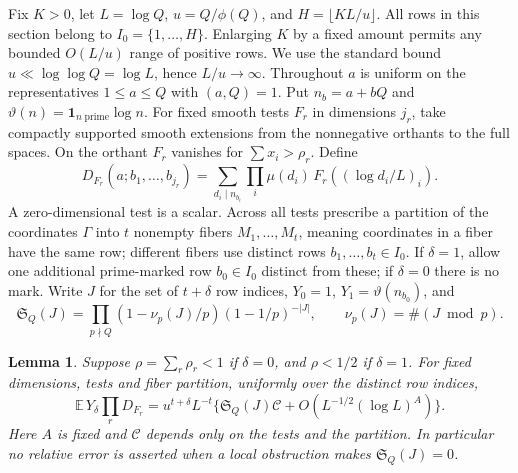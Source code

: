 \documentclass[11pt]{article}
\newtheorem{lemma}[theorem]{Lemma}
\theoremstyle{remark}
\numberwithin{equation}{section}
\newcommand{\E}{\mathbb E}
\newcommand{\Sg}{\mathfrak S}
\newcommand{\ind}{\mathbf 1}
\begin{document}
Fix $K>0$, let $L=\log Q$, $u=Q/\phi(Q)$, and
$H=\lfloor KL/u\rfloor$. All rows in this section belong to
$I_0=\{1,\ldots,H\}$. Enlarging $K$ by a fixed amount permits
any bounded $O(L/u)$ range of positive rows. We use the standard
bound $u\ll\log\log Q=\log L$, hence $L/u\to\infty$.
Throughout $a$ is uniform on the representatives $1\le a\le Q$ with
$(a,Q)=1$. Put $n_b=a+bQ$ and $\vartheta(n)=\ind_{n\;\mathrm{prime}}\log n$.
For fixed smooth tests $F_r$ in dimensions $j_r$, take compactly
supported smooth extensions from the nonnegative orthants to the full
spaces. On the orthant $F_r$ vanishes for $\sum x_i>\rho_r$. Define
\[
 D_{F_r}(a;b_1,\ldots,b_{j_r})=
 \sum_{d_i\mid n_{b_i}}\prod_i\mu(d_i)\,
 F_r((\log d_i/L)_i).
\]
A zero-dimensional test is a scalar. Across all tests prescribe a
partition of the coordinates $\Gamma$ into $t$ nonempty fibers
$M_1,\dots,M_t$, meaning coordinates in a fiber have the same row;
different fibers use distinct rows $b_1,\dots,b_t\in I_0$.
If $\delta=1$, allow one additional prime-marked row $b_0\in I_0$
distinct from these; if $\delta=0$ there is no mark. Write $J$ for
the set of $t+\delta$ row indices, $Y_0=1$, $Y_1=\vartheta(n_{b_0})$,
and
\[
 \Sg_Q(J)=\prod_{p\nmid Q}
 (1-\nu_p(J)/p)(1-1/p)^{-|J|},\qquad
 \nu_p(J)=\#(J\bmod p).
\]
\begin{lemma}\label{mixed}
Suppose $\rho=\sum_r\rho_r<1$ if $\delta=0$, and $\rho<1/2$ if
$\delta=1$. For fixed dimensions, tests and fiber partition, uniformly
over the distinct row indices,
\[
 \E\,Y_\delta\prod_r D_{F_r}
 =u^{t+\delta}L^{-t}
 \big\{\Sg_Q(J)\mathcal C+O(L^{-1/2}(\log L)^A)\big\}.
\]
Here $A$ is fixed and $\mathcal C$ depends only on the tests and
the partition. In particular no relative error is asserted when a local
obstruction makes $\Sg_Q(J)=0$.
\end{lemma}
\end{document}
